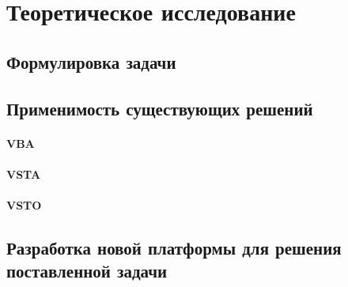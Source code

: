 \section{Теоретическое исследование}



\subsection{Формулировка задачи}
\subsection{Применимость существующих решений}
\paragraph{VBA}
\paragraph{VSTA}
\paragraph{VSTO}
\subsection{Разработка новой платформы для решения поставленной задачи}

\pagebreak